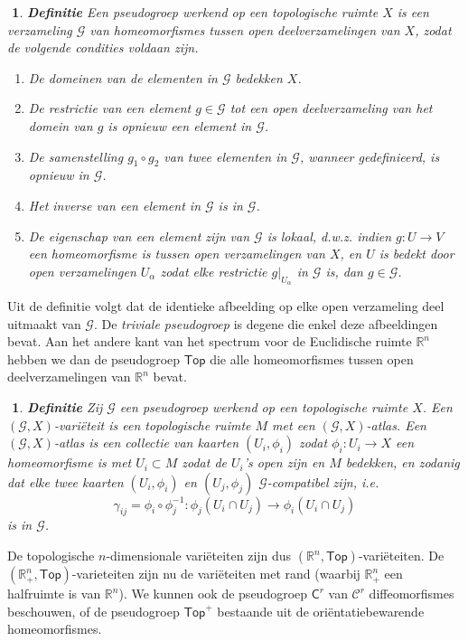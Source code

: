 \documentclass[12pt]{book}
\newcommand{\R}{\mathbb{R}}
\newtheorem{dfh}[stelh]{$\!\!$}
\newenvironment{df}{\begin{dfh} \em {\bf Definitie }}{\end{dfh}}
\begin{document}
\begin{df}
Een \emph{pseudogroep} werkend op een topologische ruimte $X$ is een verzameling $\mathcal{G}$ van homeomorfismes tussen open deelverzamelingen van $X$, zodat de volgende condities voldaan zijn.
\begin{enumerate}
\item De domeinen van de elementen in $\mathcal{G}$ bedekken $X$.
\item De restrictie van een element $g \in \mathcal{G}$ tot een open deelverzameling van het domein van $g$ is opnieuw een element in $\mathcal{G}$.
\item De samenstelling $g_1 \circ g_2$ van twee elementen in $\mathcal{G}$, wanneer gedefinieerd, is opnieuw in $\mathcal{G}$.
\item Het inverse van een element in $\mathcal{G}$ is in $\mathcal{G}$.
\item De eigenschap van een element zijn van $\mathcal{G}$ is {\em lokaal}, d.w.z. indien $g : U \to V$ een homeomorfisme is tussen open verzamelingen van $X$, en $U$ is bedekt door open verzamelingen $U_\alpha$ zodat elke restrictie $g\vert_{U_\alpha}$ in $\mathcal{G}$ is, dan $g \in \mathcal{G}$. 
\end{enumerate}
\end{df}

Uit de definitie volgt dat de identieke afbeelding op elke open verzameling deel uitmaakt van $\mathcal{G}$. De \emph{triviale pseudogroep} is degene die enkel deze afbeeldingen bevat. Aan het andere kant van het spectrum voor de Euclidische ruimte $\R^n$ hebben we dan de pseudogroep $\mathsf{Top}$ die alle homeomorfismes tussen open deelverzamelingen van $\R^n$ bevat.

\begin{df} Zij $\mathcal{G}$ een pseudogroep werkend op een topologische ruimte $X$. Een $(\mathcal{G},X)$-vari\"eteit is een topologische ruimte $M$ met een $(\mathcal{G},X)$-atlas. Een \emph{$(\mathcal{G},X)$-atlas} is een collectie van kaarten $(U_i,\phi_i)$ zodat $\phi_i : U_i \to X$ een homeomorfisme is met $U_i \subset M$ zodat de $U_i$'s open zijn en $M$ bedekken, en zodanig dat elke twee kaarten $(U_i,\phi_i)$ en $(U_j,\phi_j)$ $\mathcal{G}$-compatibel zijn, i.e. 
$$
\gamma_{ij} = \phi_i \circ \phi_j^{-1} : \phi_j(U_i \cap U_j) \to \phi_i(U_i \cap U_j)
$$
is in $\mathcal{G}$.
\end{df}

De topologische $n$-dimensionale vari\"eteiten zijn dus $(\R^n,\mathsf{Top})$-vari\"eteiten. De $(\R^n_+, \mathsf{Top})$-varieteiten zijn nu de vari\"eteiten met rand (waarbij $\R^n_+$ een halfruimte is van $\R^n$). We kunnen ook de pseudogroep $\mathsf{C}^r$ van $\mathcal{C}^r$ diffeomorfismes beschouwen, of de pseudogroep $\mathsf{Top}^+$ bestaande uit de ori\"entatiebewarende homeomorfismes.
\end{document}
